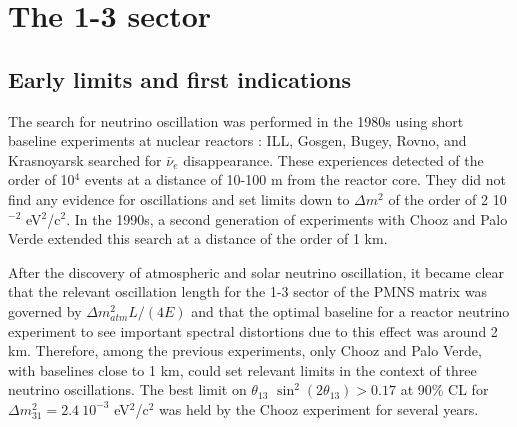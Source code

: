 \section{The 1-3 sector}

\subsection{Early limits and first indications}

The search for neutrino oscillation was performed in the 1980s using short baseline experiments at nuclear reactors : ILL, 
Gosgen, %
Bugey, Rovno,  and Krasnoyarsk searched for $\bar{\nu}_e$ disappearance.
These experiences detected of the order of 10$^4$ events at a distance of 10-100 m from the reactor core. They did not find any evidence for oscillations and set limits down to $\Delta m^2$ of the order of 2 10$^{-2}$ eV$^2$/c$^2$.
In the 1990s, a second generation of experiments with Chooz and Palo Verde extended this search at a distance of the order of 1 km.




After the discovery of atmospheric and solar neutrino oscillation, it became clear that the relevant oscillation length for the 1-3 sector of the PMNS matrix was governed by $\Delta m^2_{atm} L/(4E)$ and that the  optimal baseline for a reactor neutrino experiment to see important spectral distortions due to this effect was around 2 km.  Therefore, among the previous experiments, only Chooz and Palo Verde, with baselines close to 1 km, could set relevant limits in the context of three neutrino oscillations. The best limit on $\theta_{13}$ $\sin^2 (2 \theta_{13})>0.17 $ at 90\% CL for $\Delta m^2_{31}=2.4 \: 10^{-3}$ eV$^2$/c$^2$ was held by the Chooz experiment\cite{apollonio2003} for several years. 

